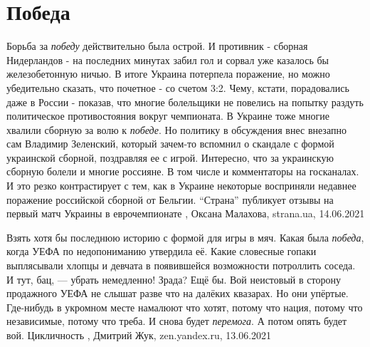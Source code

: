  
 
 
 
 
\chapter{Победа}
\label{sec:slova.pobeda}

Борьба за \emph{победу} действительно была острой. И противник - сборная Нидерландов -
на последних минутах забил гол и сорвал уже казалось бы железобетонную ничью.
В итоге Украина потерпела поражение, но можно убедительно сказать, что почетное
- со счетом 3:2. Чему, кстати, порадовались даже в России - показав, что многие
болельщики не повелись на попытку раздуть политическое противостояния вокруг
чемпионата. В Украине тоже многие хвалили сборную за волю к \emph{победе}. Но
политику в обсуждения внес внезапно сам Владимир Зеленский, который зачем-то
вспомнил о скандале с формой украинской сборной, поздравляя ее с игрой.
Интересно, что за украинскую сборную болели и многие россияне. В том числе и
комментаторы на госканалах. И это резко контрастирует с тем, как в Украине
некоторые восприняли недавнее поражение российской сборной от Бельгии.
\enquote{Страна} публикует отзывы на первый матч Украины в еврочемпионате
, 
Оксана Малахова, strana.ua, 14.06.2021

Взять хотя бы последнюю историю с формой для игры в мяч. Какая была \emph{победа},
когда УЕФА по недопониманию утвердила её. Какие словесные гопаки выплясывали
хлопцы и девчата в появившейся возможности потроллить соседа. И тут, бац, —
убрать немедленно! Зрада? Ещё бы. Вой неистовый в сторону продажного УЕФА не
слышат разве что на далёких квазарах. Но они упёртые. Где-нибудь в укромном
месте намалюют что хотят, потому что нация, потому что независимые, потому что
треба. И снова будет \emph{перемога}. А потом опять будет вой. Цикличность
, 
Дмитрий Жук, zen.yandex.ru, 13.06.2021 

